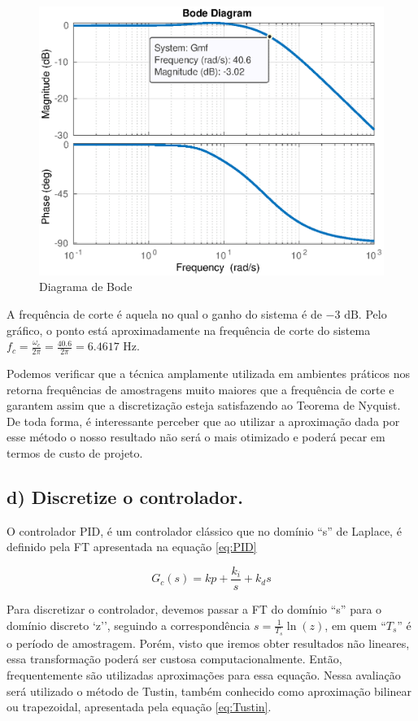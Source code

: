         \begin{figure}[!h]
            \centering
            \includegraphics[width = 0.75\linewidth]{Figuras/ProblemaPID/bodeq1c.eps}
            \caption{Diagrama de Bode}
            \label{DB}        
        \end{figure}

        A frequência de corte é aquela no qual o ganho do sistema é de $-3 \text{ dB}$. Pelo gráfico, o ponto está aproximadamente na frequência de corte do sistema 
        $f_c = \frac{\omega_c}{2\pi} = \frac{40.6}{2\pi} = 6.4617 \text{ Hz}$. 
        
        Podemos verificar que a técnica amplamente utilizada em ambientes práticos nos retorna frequências de amostragens muito maiores que a frequência de corte e 
        garantem assim que a discretização esteja satisfazendo ao Teorema de Nyquist. De toda forma, é interessante perceber que ao utilizar a aproximação dada por esse 
        método o nosso resultado não será o mais otimizado e poderá pecar em termos de custo de projeto.
    
        
    \subsection*{d) Discretize o controlador.}
        O controlador PID, é um controlador clássico que no domínio ``s'' de Laplace, é definido 
        pela FT apresentada na equação \ref{eq:PID}

        \begin{equation}
            G_c(s) = kp + \frac{k_i}{s} + k_ds
            \label{eq:PID}
        \end{equation}
        
        Para discretizar o controlador, devemos passar a FT do domínio ``s'' para o domínio discreto 
        `z'', seguindo a correspondência $ s=\frac{1}{T_s}\ln(z)$, em quem ``$T_s$'' é o período de 
        amostragem. Porém, visto que iremos obter resultados não lineares, essa transformação 
        poderá ser custosa computacionalmente. Então, frequentemente são utilizadas aproximações para
        essa equação. Nessa avaliação será utilizado o método de Tustin, também conhecido como 
        aproximação bilinear ou trapezoidal, apresentada pela equação \ref{eq:Tustin}.

